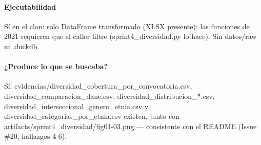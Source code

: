 \paragraph{Ejecutabilidad}
Sí en el clon: solo DataFrame transformado (XLSX presente); las funciones de 2021 requieren que el caller filtre (sprint4\_diversidad.py lo hace). Sin datos/raw ni .duckdb.

\paragraph{¿Produce lo que se buscaba?}
Sí: evidencias/diversidad\_cobertura\_por\_convocatoria.csv, diversidad\_comparacion\_dane.csv, diversidad\_distribucion\_*.csv, diversidad\_interseccional\_genero\_etnia.csv y diversidad\_categorias\_por\_etnia.csv existen, junto con artifacts/sprint4\_diversidad/fig01-03.png --- consistente con el README (Issue \#20, hallazgos 4-6).

